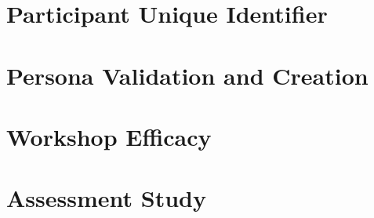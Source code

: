 \documentclass[doublespace,draft,nopageskip]{VTthesis} %
\begin{document}
    
    

    \appendix

    \begin{appendices}
        \chapter{Participant Unique Identifier} \label{app:participant-id}
            
        \chapter{Persona Validation and Creation} \label{app:persona_validation_creation}
            
        \chapter{Workshop Efficacy} \label{app:workshop_efficacy}
            
        \chapter{Assessment Study} \label{app:exercises}
            
    \end{appendices}
\end{document}
